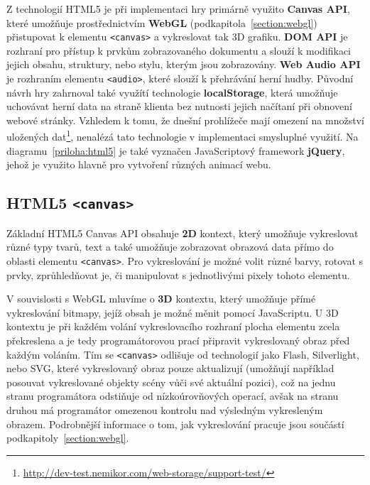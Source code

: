 Z technologií HTML5 je při implementaci hry primárně využito \textbf{Canvas API}, které umožňuje prostřednictvím \textbf{WebGL} (podkapitola~\ref{section:webgl}) přistupovat k elementu \texttt{<canvas>} a vykreslovat tak 3D grafiku. \textbf{DOM API} je rozhraní pro přístup k prvkům zobrazovaného dokumentu a slouží k modifikaci jejich obsahu, struktury, nebo stylu, kterým jsou zobrazovány. \textbf{Web Audio API} je rozhraním elementu \texttt{<audio>}, které slouží k přehrávání herní hudby. Původní návrh hry zahrnoval také využítí technologie \textbf{localStorage}, která umožňuje uchovávat herní data na straně klienta bez nutnosti jejich načítaní při obnovení webové stránky. Vzhledem k tomu, že dnešní prohlížeče mají omezení na množství uložených dat\footnote{\url{http://dev-test.nemikor.com/web-storage/support-test/}}, nenalézá tato technologie v implementaci smysluplné využití. Na diagramu~\ref{priloha:html5} je také vyznačen JavaScriptový framework \textbf{jQuery}, jehož je využito hlavně pro vytvoření různých animací webu.

\subsection*{HTML5 \texttt{<canvas>}}
\label{subsection:HTML5canvas}
Základní HTML5 Canvas API obsahuje \textbf{2D} kontext, který umožňuje vykreslovat různé typy tvarů, text a také umožňuje zobrazovat obrazová data přímo do oblasti elementu \texttt{<canvas>}. Pro vykreslování je možné volit různé barvy, rotovat s prvky, zprůhledňovat je, či manipulovat s jednotlivými pixely tohoto elementu.

V souvislosti s WebGL mluvíme o \textbf{3D} kontextu, který umožňuje přímé vykreslování bitmapy, jejíž obsah je možné měnit pomocí JavaScriptu. U 3D kontextu je při každém volání vykreslovacího rozhraní plocha elementu zcela překreslena a je tedy programátorovou prací připravit vykreslovaný obraz před každým voláním. Tím se \texttt{<canvas>} odlišuje od technologií jako Flash, Silverlight, nebo SVG, které vykreslovaný obraz pouze aktualizují (umožňují například posouvat vykreslované objekty scény vůči své aktuální pozici), což na jednu stranu programátora odstiňuje od nízkoúrovňových operací, avšak na stranu druhou má programátor omezenou kontrolu nad výsledným vykresleným obrazem. Podrobnější informace o tom, jak vykreslování pracuje jsou součástí podkapitoly~\ref{section:webgl}.

